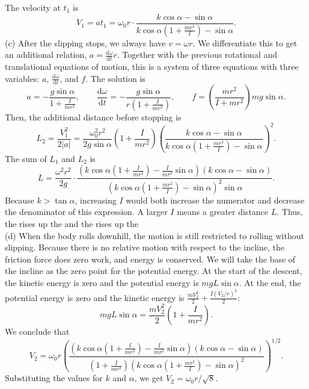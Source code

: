 \documentclass[../TST.tex]{subfiles}
\begin{document}
\begin{solution}
\begin{equation*}
\end{equation*}
The velocity at $t_1$ is
\begin{equation*}
	V_1=at_1=\boxed{\omega_0r\cdot \frac{k\cos{\alpha}-\sin{\alpha}}{k\cos{\alpha}\left(1+\frac{mr^2}{I}\right)-\sin{\alpha}}.}
\end{equation*}
(c) After the slipping stops, we always have $v=\omega r$. We differentiate this to get an additional relation, $a=\frac{\mathrm{d}\omega}{\mathrm{d}t}r$. Together  with the previous rotational and translational equations of motion, this is a system of three equations with three variables: $a$, $\frac{\mathrm{d}\omega}{\mathrm{d}t}$, and $f$. The solution is
\begin{equation*}
	a=-\frac{g\sin{\alpha}}{1+\frac{I}{mr^2}}, \quad\quad \frac{\mathrm{d}\omega}{\mathrm{d}t}=-\frac{g\sin{\alpha}}{r\left(1+\frac{I}{mr^2}\right)}, \quad\quad f=\left( \frac{mr^2}{I+mr^2}\right){mg\sin{\alpha}} .
\end{equation*}
Then, the additional distance before stopping is 
\begin{equation*}
	L_2=\frac{V_1^2}{2|a|}=\boxed{\frac{\omega_0^2r^2}{2g\sin{\alpha}}\left(1+\frac{I}{mr^2}\right)\left(\frac{k\cos{\alpha}-\sin{\alpha}}{k\cos{\alpha}\left(1+\frac{mr^2}{I}\right)-\sin{\alpha} }\right)^2  .}
\end{equation*}
The sum of $L_1$ and $L_2$ is 
\begin{equation*}
	L=\frac{\omega^2r^2}{2g}\cdot \frac{\left(k\cos{\alpha}\left(1+\frac{I}{mr^2}\right)-\frac{I}{mr^2}\sin{\alpha}\right) \left(k\cos{\alpha}-\sin{\alpha}\right)}{\left(k\cos{\alpha}\left(1+\frac{mr^2}{I}\right) -\sin{\alpha}\right)^2 \sin{\alpha}}
.
\end{equation*}
Because $k>\tan{\alpha}$, increasing $I$ would both increase the numerator and decrease the denominator of this expression. A larger $I$ means a greater distance $L$. Thus, the  rises up the  and the  rises up the \\

(d) When the body rolls downhill, the motion is still restricted to rolling without slipping. Because there is no relative motion with respect to the incline, the friction force does zero work, and energy is conserved. We will take the base of the incline as the zero point for the potential energy. At the start of the descent, the kinetic energy is zero and the potential energy is $mgL\sin{\alpha}$. At the end, the potential energy is zero and the kinetic energy is $\frac{mV_2^2}{2}+\frac{I(V_2/r)^2}{2}$:
\begin{equation*}
	mgL\sin{\alpha}=\frac{mV_2^2}{2}\left(1+\frac{I}{mr^2}\right) 
.
\end{equation*}
We conclude that
\begin{equation*}
	\boxed{V_2=\omega_0r \left(\frac{\left(k\cos{\alpha}\left(1+\frac{I}{mr^2}\right)-\frac{I}{mr^2}\sin{\alpha}\right)\left(k\cos{\alpha}-\sin{\alpha}\right)  }{\left(1+\frac{I}{mr^2}\right)\left(k\cos{\alpha}\left(1+\frac{mr^2}{I}\right) -\sin{\alpha}\right)^2}\right)^{1/2}.}
\end{equation*}
Substituting the values for $k$ and $\alpha$, we get $\boxed{V_2=\omega_0r/\sqrt{8}.}$

\end{solution}
\fi
\ifprob 
	\clearpage
\else 
\fi
\end{document}
